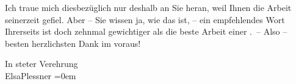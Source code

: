 \pstart
           Ich traue mich diesbezüglich nur deshalb an Sie heran, weil Ihnen die Arbeit
               seinerzeit gefiel. Aber – Sie wissen ja, wie das ist, – ein empfehlendes Wort
               Ihrerseits ist doch zehnmal gewichtiger als die beste Arbeit einer \label{K_L03694-22v}\label{}. – Also – besten
               herzlichsten Dank im voraus!\pend
           
\pstart
           In steter Verehrung{\\[\baselineskip]}\spacefill\mbox{ElsaPlessner}\pend
           \leftskip=0em{}\endnumbering{}
\begin{anhang}
\end{anhang}
      